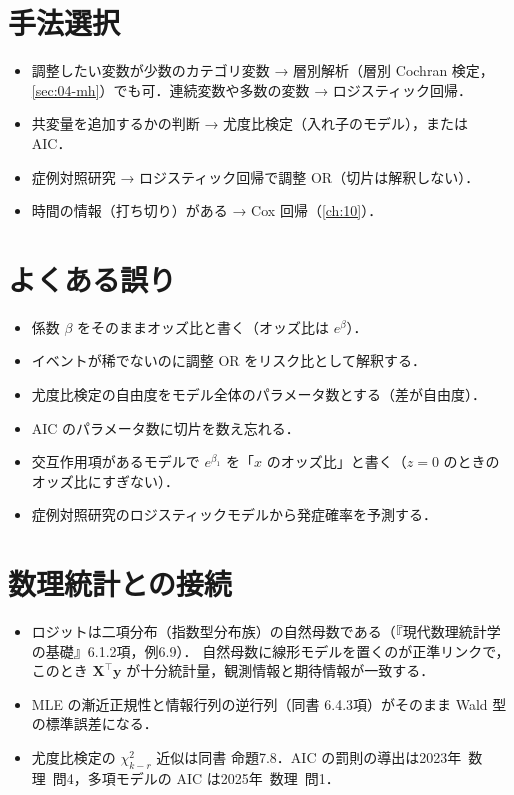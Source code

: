 \documentclass[a4paper,11pt,openany]{ltjsbook}
\newcommand{\kakomonSM}[2]{\mbox{#1年 数理 問#2}}
\newcommand{\transp}{^{\top}}
\begin{document}
\section{手法選択}\label{sec:06-choice}
\begin{itemize}
\item 調整したい変数が少数のカテゴリ変数 → 層別解析（層別 Cochran 検定，\cref{sec:04-mh}）でも可．連続変数や多数の変数 → ロジスティック回帰．
\item 共変量を追加するかの判断 → 尤度比検定（入れ子のモデル），または AIC．
\item 症例対照研究 → ロジスティック回帰で調整 OR（切片は解釈しない）．
\item 時間の情報（打ち切り）がある → Cox 回帰（\cref{ch:10}）．
\end{itemize}

\section{よくある誤り}\label{sec:06-err}
\begin{warnbox}
\begin{itemize}
\item 係数 $\beta$ をそのままオッズ比と書く（オッズ比は $e^\beta$）．
\item イベントが稀でないのに調整 OR をリスク比として解釈する．
\item 尤度比検定の自由度をモデル全体のパラメータ数とする（差が自由度）．
\item AIC のパラメータ数に切片を数え忘れる．
\item 交互作用項があるモデルで $e^{\beta_1}$ を「$x$ のオッズ比」と書く（$z=0$ のときのオッズ比にすぎない）．
\item 症例対照研究のロジスティックモデルから発症確率を予測する．
\end{itemize}
\end{warnbox}

\section{数理統計との接続}\label{sec:06-link}
\begin{linkbox}
\begin{itemize}
\item ロジットは二項分布（指数型分布族）の自然母数である（『現代数理統計学の基礎』6.1.2項，例6.9）．
      自然母数に線形モデルを置くのが正準リンクで，このとき $\bm X\transp\bm y$ が十分統計量，観測情報と期待情報が一致する．
\item MLE の漸近正規性と情報行列の逆行列（同書 6.4.3項）がそのまま Wald 型の標準誤差になる．
\item 尤度比検定の $\chi^2_{k-r}$ 近似は同書 命題7.8．AIC の罰則の導出は\kakomonSM{2023}{4}，多項モデルの AIC は\kakomonSM{2025}{1}．
\end{itemize}
\end{linkbox}
\end{document}
